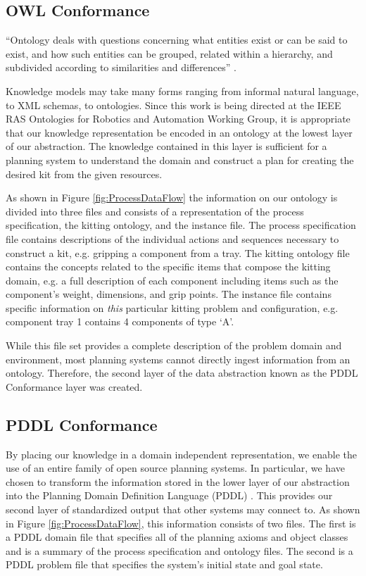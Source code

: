 \documentclass[a4paper, 10pt, conference]{ieeeconf}      %
\begin{document}
\subsection{OWL Conformance}
``Ontology deals with questions concerning what entities exist or can be said to exist, and how such entities can be grouped, related within a hierarchy, and subdivided according to similarities and differences'' \cite{ontologyDef}.

Knowledge models may take many forms ranging from informal natural language, to XML schemas, to ontologies.
Since this work is being directed at the IEEE RAS Ontologies for Robotics and Automation Working Group, it is appropriate that our  knowledge representation be
encoded in an ontology at the lowest layer of our abstraction. The knowledge contained in this layer is sufficient for a planning system to understand the domain and construct
a plan for creating the desired kit from the given resources.

As shown in Figure \ref{fig:ProcessDataFlow} the information on our ontology is divided into three files and consists of a representation of the process specification,
the kitting ontology, and the instance file. The process specification file contains descriptions of
the individual actions and sequences necessary to construct a kit, e.g. gripping a component from a tray. The kitting ontology file contains the concepts related to the specific items
that compose the kitting domain, e.g. a full description of each component including items such as the component's weight, dimensions, and grip points. The instance file
contains specific information on {\it this} particular kitting problem and configuration, e.g. component tray 1 contains 4 components of type `A'.

While this file set provides a complete description of the problem domain and environment, most planning systems cannot directly ingest information from an ontology.
Therefore, the second layer of the data abstraction known as the PDDL Conformance layer was created.

\subsection{PDDL Conformance}
By placing our knowledge in a domain independent representation, we enable the use of an entire family of open source planning systems.
In particular, we have chosen to transform the information stored in the lower layer of our abstraction into the Planning Domain Definition Language (PDDL) \cite{PDDL}.
This provides our second layer of standardized output that other systems may connect to. As shown in Figure \ref{fig:ProcessDataFlow}, this information consists of two files. The first
is a PDDL domain file that specifies all of the planning axioms and object classes and is a summary of the process specification and ontology files. The second is a PDDL problem file that
specifies the system's initial state and goal state.
\end{document}

